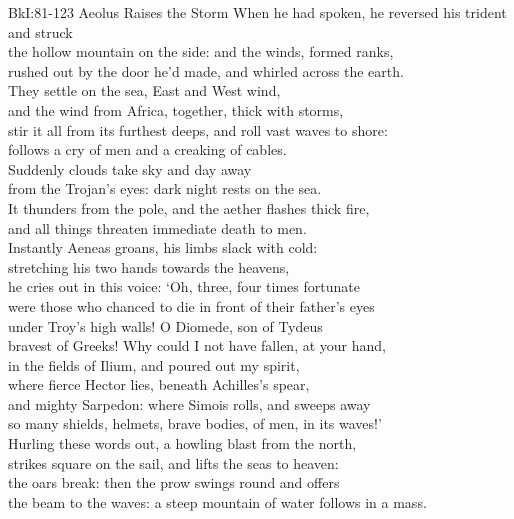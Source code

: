 \documentclass[12pt, a5paper]{minimal}
\begin{document}
{BkI:81-123 Aeolus Raises the Storm}
When he had spoken, he reversed his trident and struck\\
the hollow mountain on the side: and the winds, formed ranks,\\
rushed out by the door he'd made, and whirled across the earth.\\
They settle on the sea, East and West wind,\\
and the wind from Africa, together, thick with storms,\\
stir it all from its furthest deeps, and roll vast waves to shore:\\
follows a cry of men and a creaking of cables.\\
Suddenly clouds take sky and day away\\
from the Trojan's eyes: dark night rests on the sea.\\
It thunders from the pole, and the aether flashes thick fire,\\
and all things threaten immediate death to men.\\
Instantly Aeneas groans, his limbs slack with cold:\\
stretching his two hands towards the heavens,\\
he cries out in this voice: `Oh, three, four times fortunate\\
were those who chanced to die in front of their father's eyes\\
under Troy's high walls! O Diomede, son of Tydeus\\
bravest of Greeks! Why could I not have fallen, at your hand,\\
in the fields of Ilium, and poured out my spirit,\\
where fierce Hector lies, beneath Achilles's spear,\\
and mighty Sarpedon: where Simois rolls, and sweeps away\\
so many shields, helmets, brave bodies, of men, in its waves!'\\
Hurling these words out, a howling blast from the north,\\
strikes square on the sail, and lifts the seas to heaven:\\
the oars break: then the prow swings round and offers\\
the beam to the waves: a steep mountain of water follows in a mass.\\
\end{document}
